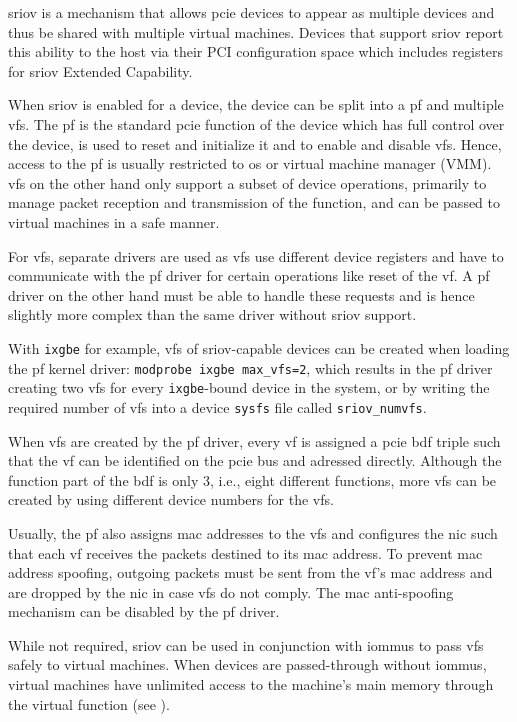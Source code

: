 \Acf{sriov} is a mechanism that allows \ac{pcie} devices to appear as multiple
devices and thus be shared with multiple virtual machines. Devices that support
\ac{sriov} report this ability to the host via their PCI configuration space
which includes registers for \ac{sriov} Extended Capability.

When \ac{sriov} is enabled for a device, the device can be split into a \ac{pf}
and multiple \acp{vf}. The \ac{pf} is the standard \ac{pcie} function of the
device which has full control over the device, is used to reset and initialize
it and to enable and disable \acp{vf}. Hence, access to the \ac{pf} is usually
restricted to \ac{os} or virtual machine manager (VMM). \acp{vf} on the other
hand only support a subset of device operations, primarily to manage packet
reception and transmission of the function, and can be passed to virtual
machines in a safe manner.

For \acp{vf}, separate drivers are used as \acp{vf} use different device
registers and have to communicate with the \ac{pf} driver for certain operations
like reset of the \ac{vf}. A \ac{pf} driver on the other hand must be able to
handle these requests and is hence slightly more complex than the same driver
without \ac{sriov} support.

With \texttt{ixgbe} for example, \acp{vf} of \ac{sriov}-capable devices can be
created when loading the \ac{pf} kernel driver: \texttt{modprobe ixgbe
max\_vfs=2}, which results in the \ac{pf} driver creating two \acp{vf} for every
\texttt{ixgbe}-bound device in the system, or by writing the required number of
\acp{vf} into a device \texttt{sysfs} file called \texttt{sriov\_numvfs}.

When \acp{vf} are created by the \ac{pf} driver, every \ac{vf} is assigned a
\ac{pcie} \ac{bdf} triple such that the \ac{vf} can be identified on the
\ac{pcie} bus and adressed directly. Although the function part of the \ac{bdf}
is only \SI{3}{\bit}, i.e., eight different functions, more \acp{vf} can be
created by using different device numbers for the \acp{vf}.

Usually, the \ac{pf} also assigns \ac{mac} addresses to the \acp{vf} and
configures the \ac{nic} such that each \ac{vf} receives the packets destined to
its \ac{mac} address. To prevent \ac{mac} address spoofing, outgoing packets
must be sent from the \ac{vf}'s \ac{mac} address and are dropped by the \ac{nic}
in case \acp{vf} do not comply. The \ac{mac} anti-spoofing mechanism can be
disabled by the \ac{pf} driver.

While not required, \ac{sriov} can be used in conjunction with \acp{iommu} to
pass \acp{vf} safely to virtual machines. When devices are passed-through
without \acp{iommu}, virtual machines have unlimited access to the machine's
main memory through the virtual function (see ).

